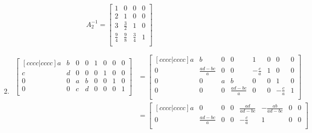 \documentclass[12pt,letterpaper]{article}
\begin{document}
\begin{enumerate}
\begin{enumerate}
\begin{enumerate}[label=(\alph*)]
              \[
                A_2^{-1}
                =
                \begin{bmatrix}
                  1           &  0           &  0           &  0 \\
                  2           &  1           &  0           &  0 \\
                  3           &  \frac{3}{2} &  1           &  0 \\
                  \frac{9}{4} &  \frac{9}{8} &  \frac{3}{4} &  1 \\
                \end{bmatrix}
              \]
            \item
              \begin{align*}
                \begin{bmatrix}[c c c c | c c c c]
                   a &  b &  0 &  0 &  1 &  0 &  0 &  0 \\
                   c &  d &  0 &  0 &  0 &  1 &  0 &  0 \\
                   0 &  0 &  a &  b &  0 &  0 &  1 &  0 \\
                   0 &  0 &  c &  d &  0 &  0 &  0 &  1 \\
                \end{bmatrix}
                &=
                \begin{bmatrix}[c c c c | c c c c]
                   a &  b               &  0 &  0               &  1           &  0 &  0           &  0 \\
                   0 &  \frac{ad-bc}{a} &  0 &  0               & -\frac{c}{a} &  1 &  0           &  0 \\
                   0 &  0               &  a &  b               &  0           &  0 &  1           &  0 \\
                   0 &  0               &  0 &  \frac{ad-bc}{a} &  0           &  0 & -\frac{c}{a} &  1 \\
                \end{bmatrix}
                \\
                &=
                \begin{bmatrix}[c c c c | c c c c]
                   a &  0               &  0 &  0               &  \frac{ad}{ad - bc} &  -\frac{ab}{ad - bc} &  0                  &  0                   \\
                   0 &  \frac{ad-bc}{a} &  0 &  0               & -\frac{c}{a}        &  1                   &  0                  &  0                   \\

\end{bmatrix}
\end{align*}
\end{enumerate}
\end{enumerate}
\end{enumerate}
\end{document}
